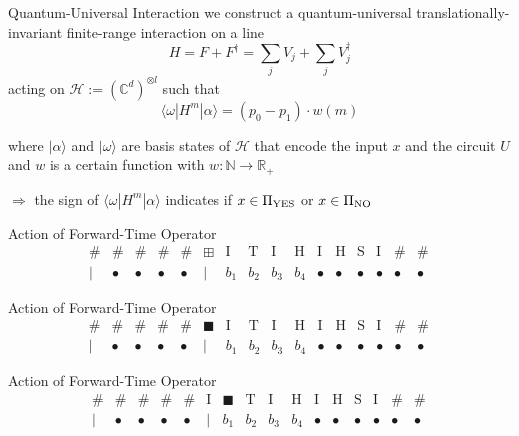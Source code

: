 \documentclass[slideColor]{prosper}
\newcommand{\C}{{\mathbb{C}}}
\newcommand{\N}{{\mathbb{N}}}
\renewcommand{\R}{{\mathbb{R}}}
\newcommand{\cH}{{\mathcal{H}}}
\renewcommand{\>}{\rangle}
\newcommand{\<}{\langle}
\newcommand{\I}{\mathrm{I}}
\renewcommand{\H}{\mathrm{H}}
\renewcommand{\S}{\mathrm{S}}
\newcommand{\T}{\mathrm{T}}
\begin{document}

\begin{slide}{Quantum-Universal Interaction}
we construct a quantum-universal translationally-invariant finite-range interaction on a line 
\[
H = F + F^\dagger = \sum_j V_j + \sum_j V_j^\dagger
\]
acting on $\cH:=(\C^d)^{\otimes l}$ such that
\[
\<\omega|H^m|\alpha\>=(p_0 - p_1) \cdot w(m)
\]

where $|\alpha\>$ and $|\omega\>$ are basis states of $\cH$ that encode the input $x$ and the circuit $U$
and $w$ is a certain function with $w : \N \rightarrow \R_+$

\bigskip 
$\Longrightarrow$ the sign of $\<\omega|H^m|\alpha\>$ indicates if $x\in\Pi_{\rm YES}$ or $x\in\Pi_{\rm NO}$
\end{slide}


\begin{slide}{Action of Forward-Time Operator}
\[
\begin{array}{cccccccccccccccccc}
\#   &\#      &\#      &\#      &\#      &\boxplus & \I  & \T  & \I  &\H      &\I      &\H      &\S      &\I  &\#     &\#  \\
\mid &\bullet &\bullet &\bullet &\bullet &\mid     & b_1 & b_2 & b_3 & b_4    &\bullet &\bullet &\bullet &\bullet &\bullet &\bullet
\end{array}\,
\]
\end{slide}


\begin{slide}{Action of Forward-Time Operator}
\[
\begin{array}{cccccccccccccccccc}
\#   &\#      &\#      &\#      &\#      &\blacksquare & \I  & \T  & \I  &\H      &\I      &\H      &\S      &\I  &\#     &\#  \\
\mid &\bullet &\bullet &\bullet &\bullet &\mid    & b_1 & b_2 & b_3 & b_4    &\bullet &\bullet &\bullet &\bullet &\bullet &\bullet
\end{array}\,
\]
\end{slide}


\begin{slide}{Action of Forward-Time Operator}
\[
\begin{array}{cccccccccccccccccc}
\#   &\#      &\#      &\#      &\#      &\I      & \blacksquare  & \T  & \I  &\H      &\I      &\H      &\S      &\I  &\#     &\#  \\
\mid &\bullet &\bullet &\bullet &\bullet &\mid    & b_1 & b_2 & b_3 & b_4    &\bullet &\bullet &\bullet &\bullet &\bullet &\bullet
\end{array}\,
\]
\end{slide}
\end{document}
